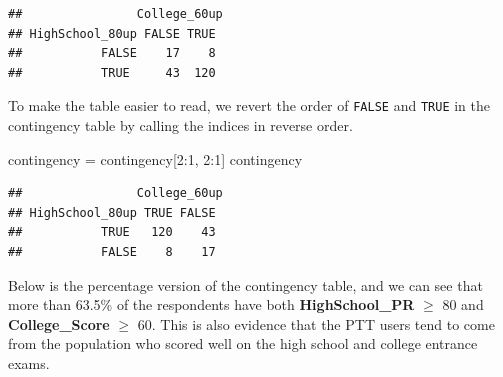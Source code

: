 \documentclass[
]{article}
\newenvironment{Shaded}{\begin{snugshade}}{\end{snugshade}}
\newcommand{\AttributeTok}[1]{\textcolor[rgb]{0.77,0.63,0.00}{#1}}
\newcommand{\DecValTok}[1]{\textcolor[rgb]{0.00,0.00,0.81}{#1}}
\newcommand{\FunctionTok}[1]{\textcolor[rgb]{0.00,0.00,0.00}{#1}}
\newcommand{\NormalTok}[1]{#1}
\newcommand{\OtherTok}[1]{\textcolor[rgb]{0.56,0.35,0.01}{#1}}
\newcommand{\SpecialCharTok}[1]{\textcolor[rgb]{0.00,0.00,0.00}{#1}}
\newcommand{\StringTok}[1]{\textcolor[rgb]{0.31,0.60,0.02}{#1}}
\begin{document}
\begin{Shaded}
\end{Shaded}

\begin{verbatim}
##                College_60up
## HighSchool_80up FALSE TRUE
##           FALSE    17    8
##           TRUE     43  120
\end{verbatim}

To make the table easier to read, we revert the order of \texttt{FALSE}
and \texttt{TRUE} in the contingency table by calling the indices in
reverse order.

\begin{Shaded}
\begin{Highlighting}[]
\NormalTok{contingency }\OtherTok{=}\NormalTok{ contingency[}\DecValTok{2}\SpecialCharTok{:}\DecValTok{1}\NormalTok{, }\DecValTok{2}\SpecialCharTok{:}\DecValTok{1}\NormalTok{]}
\NormalTok{contingency}
\end{Highlighting}
\end{Shaded}

\begin{verbatim}
##                College_60up
## HighSchool_80up TRUE FALSE
##           TRUE   120    43
##           FALSE    8    17
\end{verbatim}

Below is the percentage version of the contingency table, and we can see
that more than 63.5\% of the respondents have both
\textbf{HighSchool\_PR} \(\geq\) 80 and \textbf{College\_Score} \(\geq\)
60. This is also evidence that the PTT users tend to come from the
population who scored well on the high school and college entrance
exams.
\end{document}
